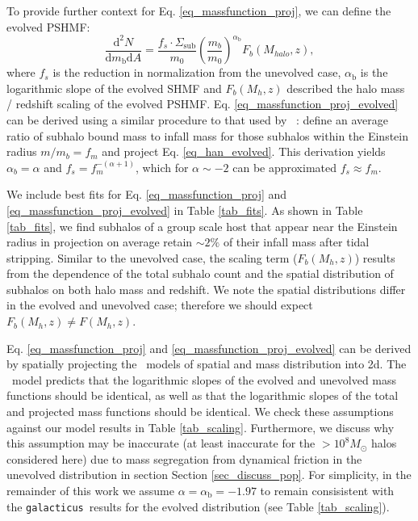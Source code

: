 \documentclass[%
 reprint,
 amsmath,
 amssymb,
 aps,
prd,
twocolumn,
superscriptaddress,
preprintnumbers,
floatfix,
nofootinbib
]{revtex4-2}
\def\gal{{\tt galacticus}~}
\def\hanetal{\citet{10.1093/mnras/stv2900}~}
\newcommand{\refsec}[1]{Section \ref{#1}}
\newcommand{\reftable}[1]{Table \ref{#1}}
\newcommand{\refeq}[1]{Eq. \ref{#1}}
\begin{document}
To provide further context for \refeq{eq_massfunction_proj}, we can define the evolved PSHMF:
\begin{equation}\label{eq_massfunction_proj_evolved}
    \frac{\mathrm{d}^2N}{\mathrm{d}m_{\mathrm{b}}\mathrm{d}A} = \frac{f_{s} \cdot \Sigma_{\mathrm{sub}}}{m_0} \left( \frac{m_{b}}{m_0} \right)^{\alpha_{\mathrm{b}}} F_b(M_{halo},z),
\end{equation}
where $f_s$ is the reduction in normalization from the unevolved case, $\alpha_{\mathrm{b}}$ is the logarithmic slope of the evolved SHMF and $F_{b}(M_h,z)$ described the halo mass / redshift scaling of the evolved PSHMF. 
\refeq{eq_massfunction_proj_evolved} can be derived using a similar procedure to that used by \hanetal : define an average ratio of subhalo bound mass to infall mass for those subhalos within the Einstein radius  $m / m_b = f_m$ and project \refeq{eq_han_evolved}.
This derivation yields $\alpha_b = \alpha$ and $f_s = f_{m}^{-(\alpha+1)}$, which for $\alpha \sim -2$ can be approximated $f_s \approx f_m$. 

We include best fits for Eq. \ref{eq_massfunction_proj} and \ref{eq_massfunction_proj_evolved} in \reftable{tab_fits}. 
As shown in \reftable{tab_fits}, we find subhalos of a group scale host that appear near the Einstein radius in projection on average retain $\sim 2\%$ of their infall mass after tidal stripping.
Similar to the unevolved case, the scaling term ($F_b(M_h, z)$) results from the dependence of the total subhalo count and the spatial distribution of subhalos on both halo mass and redshift. 
We note the spatial distributions differ in the evolved and unevolved case; therefore we should expect $F_b(M_h,z) \ne F(M_h,z)$.



Eq. \ref{eq_massfunction_proj} and \ref{eq_massfunction_proj_evolved} can be derived by spatially projecting the \hanetal models of spatial and mass distribution into 2d.
The \hanetal model predicts that the logarithmic slopes of the evolved and unevolved mass functions should be identical, as well as that the logarithmic slopes of the total and projected mass functions should be identical.
We check these assumptions against our model results in \reftable{tab_scaling}. 
Furthermore, we discuss why this assumption may be inaccurate (at least inaccurate for the $> 10^8 M_\odot$ halos considered here) due to mass segregation from dynamical friction in the unevolved distribution in section \refsec{sec_discuss_pop}.
For simplicity, in the remainder of this work we assume $\alpha = \alpha_{\mathrm{b}} = -1.97$ to remain consisistent with the \gal results for the evolved distribution (see \reftable{tab_scaling}).
\end{document}
